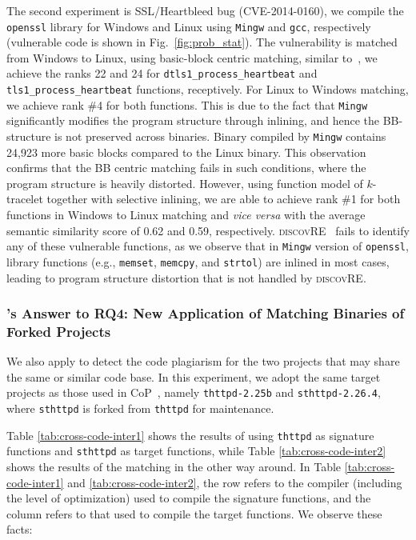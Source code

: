 The second experiment is SSL/Heartbleed bug (CVE-2014-0160), we compile the \texttt{openssl} library for Windows and Linux using \texttt{Mingw} and \texttt{gcc}, respectively (vulnerable code is shown in Fig.~\ref{fig:prob_stat}). The vulnerability is matched from Windows to Linux, using basic-block centric matching, similar to~\cite{DBLP:conf/sp/PewnyGGRH15}, we achieve the ranks 22 and 24 for \texttt{dtls1\_process\_heartbeat} and \texttt{tls1\_process\_heartbeat} functions, receptively. For Linux to Windows matching, we achieve rank \#4 for both functions. This is due to the fact that  \texttt{Mingw} significantly modifies the program structure through inlining, and hence the BB-structure is not preserved across binaries. Binary compiled by \texttt{Mingw} contains 24,923 more basic blocks compared to the Linux binary. This observation confirms that the BB centric matching fails in such conditions, where the program structure is heavily distorted. However, using function model of $k$-tracelet together with selective inlining, we are able to achieve rank \#1 for both functions in Windows to Linux matching and \emph{vice versa} with the average semantic similarity score of 0.62 and 0.59, respectively. \textsc{\small discovRE}~\cite{sebastian2016discovre} fails to identify any of these vulnerable functions, as we observe that in \texttt{Mingw} version of \texttt{openssl}, library functions (e.g., \texttt{memset}, \texttt{memcpy}, and \texttt{strtol}) are inlined in most cases, leading to  program structure distortion that is not handled by \textsc{\small discovRE}.

\subsubsection{\toolNew's Answer to RQ4: New Application of Matching Binaries of Forked Projects}

We also apply \toolNew to detect the code plagiarism for the two projects that may share the same or similar code base.
In this experiment, we adopt the same target projects as those used in CoP~\cite{luo2014semantics}, namely \texttt{thttpd-2.25b}  and \texttt{sthttpd-2.26.4}, where \texttt{sthttpd} is forked from \texttt{thttpd} for maintenance.

Table \ref{tab:cross-code-inter1} shows the results of using \texttt{thttpd} as signature functions and  \texttt{sthttpd}  as target functions, while Table \ref{tab:cross-code-inter2} shows the results of the matching in the other way around. In Table \ref{tab:cross-code-inter1} and \ref{tab:cross-code-inter2}, the row refers to the compiler (including the level of optimization) used to compile the signature functions, and the column refers to that used to compile the target functions. We observe these facts:

